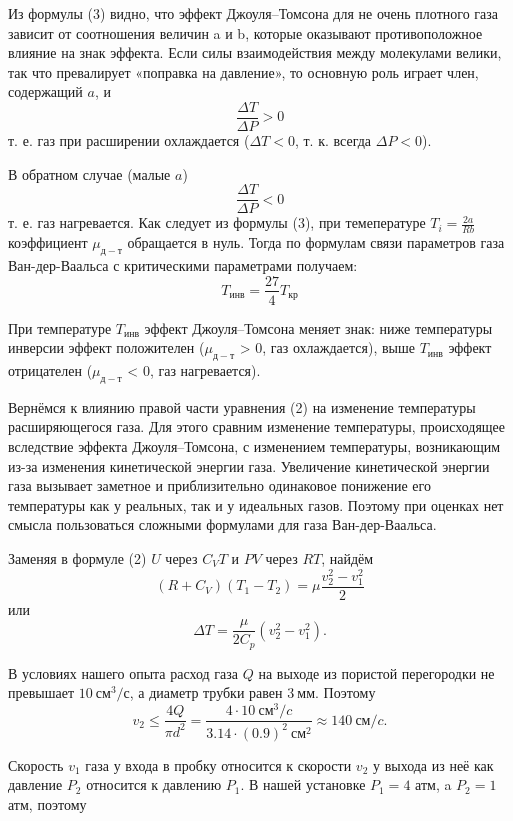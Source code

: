 \documentclass[12pt,a4paper]{article}
\begin{document}
Из формулы (3) видно, что эффект Джоуля–Томсона для не очень плотного газа зависит от соотношения величин a и b, которые оказывают противоположное влияние на знак эффекта. 
Если силы взаимодействия между молекулами велики, так что превалирует «поправка на давление», то основную роль играет член, содержащий $a$, и $$\frac {\Delta T} {\Delta P} > 0$$
т. е. газ при расширении охлаждается ($\Delta T < 0$, т. к. всегда $\Delta P < 0$).

В обратном случае (малые $a$) $$\frac {\Delta T} {\Delta P} < 0$$ т. е. газ нагревается. 
Как следует из формулы (3), при темепературе $T_i = \frac{2a}{Rb}$ коэффициент $\mu_{д-т}$ обращается в нуль.
Тогда по формулам связи параметров газа Ван-дер-Ваальса с критическими параметрами получаем:
\begin{equation}
    T_{инв} = \frac{27}4 T_{кр}
\end{equation} 

При температуре $T_{инв}$ эффект Джоуля–Томсона меняет знак: ниже температуры инверсии эффект положителен ($\mu_{д-т}$ > 0, газ охлаждается), выше $T_{инв}$ эффект отрицателен ($\mu_{д-т}$ < 0, газ нагревается).

Вернёмся к влиянию правой части уравнения (2) на изменение температуры расширяющегося газа. 
Для этого сравним изменение температуры, происходящее вследствие эффекта Джоуля–Томсона, с изменением температуры, возникающим из-за изменения кинетической энергии газа. 
Увеличение кинетической энергии газа вызывает заметное и приблизительно одинаковое понижение его температуры как у реальных, так и у идеальных газов. 
Поэтому при оценках нет смысла пользоваться сложными формулами для газа Ван-дер-Ваальса.

Заменяя в формуле (2) $U$ через $C_V T$ и $P V$ через $R T$, найдём
\begin{equation*}
    (R + C_V)(T_1 - T_2) = \mu \frac{v_2^2 - v_1^2}2
\end{equation*}
или 
\begin{equation*}
    \Delta T = \frac{\mu}{2C_p} (v_2^2-v_1^2).
\end{equation*}

В условиях нашего опыта расход газа $Q$ на выходе из пористой перегородки не превышает $10\ см^3/с$, а диаметр трубки равен $3\ мм$. Поэтому
\begin{equation*}
    v_2 \le \frac{4Q}{\pi d^2} = \frac{4\cdot 10\ см^3/c}{3.14 \cdot (0.9)^2\ см^2} \approx 140\ см/c.
\end{equation*}

Скорость $v_1$ газа у входа в пробку относится к скорости $v_2$ у выхода из неё как давление $P_2$ относится к давлению $P_1$. 
В нашей установке $P_1 = 4$ атм, a $P_2 = 1$ атм, поэтому
\end{document}
